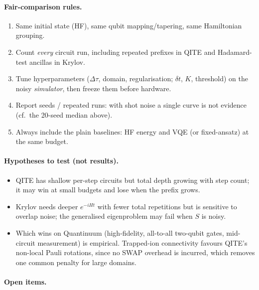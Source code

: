 \documentclass[11pt,a4paper]{article}
\begin{document}
\paragraph{Fair-comparison rules.}
\begin{enumerate}
\item Same initial state (HF), same qubit mapping/tapering, same Hamiltonian grouping.
\item Count \emph{every} circuit run, including repeated prefixes in QITE and Hadamard-test ancillas
in Krylov.
\item Tune hyperparameters ($\Delta\tau$, domain, regularisation; $\delta t$, $K$, threshold) on
the noisy \emph{simulator}, then freeze them before hardware.
\item Report seeds / repeated runs: with shot noise a single curve is not evidence (cf.\ the 20-seed median above).
\item Always include the plain baselines: HF energy and VQE (or fixed-ansatz) at the same budget.
\end{enumerate}

\paragraph{Hypotheses to test (not results).}
\begin{itemize}
\item QITE has shallow per-step circuits but total depth growing with step count; it may win at small
budgets and lose when the prefix grows.
\item Krylov needs deeper $e^{-iHt}$ with fewer total repetitions but is sensitive to overlap noise;
the generalised eigenproblem may fail when $S$ is noisy.
\item Which wins on Quantinuum (high-fidelity, all-to-all two-qubit gates, mid-circuit
measurement) is empirical. Trapped-ion connectivity favours QITE's non-local Pauli rotations,
since no SWAP overhead is incurred, which removes one common penalty for large domains.
\end{itemize}

\paragraph{Open items.}
\end{document}
